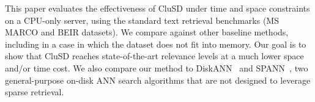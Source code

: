 This paper evaluates  the effectiveness of CluSD  under time and space constraints on a CPU-only server, 
using the standard text retrieval benchmarks (MS MARCO and BEIR  datasets).
We compare against other baseline methods, including in a case in which the dataset does not fit into memory.
Our goal is to show that CluSD reaches state-of-the-art relevance levels at a much lower space and/or time cost.
We also compare our method to DiskANN~\cite{NEURIPS2019_DiskANN} and SPANN~\cite{chen2021spann},
two general-purpose on-disk ANN search algorithms that are not designed to leverage sparse retrieval.
 





